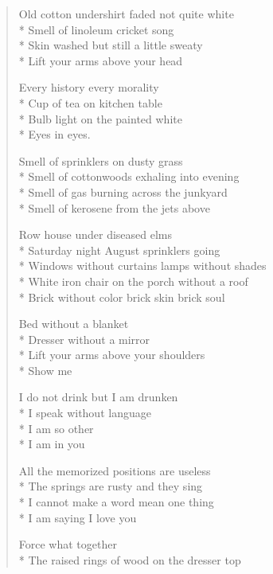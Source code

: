 \documentclass[english,11pt,letterpaper,onecolumn]{scrbook}
\begin{document}
\begin{verse}
Old cotton undershirt faded not quite white \\*
Smell of linoleum cricket song \\*
Skin washed but still a little sweaty \\*
Lift your arms above your head



Every history every morality \\*
Cup of tea on kitchen table \\*
Bulb light on the painted white \\*
Eyes in eyes.



Smell of sprinklers on dusty grass \\*
Smell of cottonwoods exhaling into evening \\*
Smell of gas burning across the junkyard \\*
Smell of kerosene from the jets above



Row house under diseased elms \\*
Saturday night August sprinklers going \\*
Windows without curtains lamps without shades \\*
White iron chair on the porch without a roof \\*
Brick without color brick skin brick soul



Bed without a blanket \\*
Dresser without a mirror \\*
Lift your arms above your shoulders \\*
Show me



I do not drink but I am drunken \\*
I speak without language \\*
I am so other \\*
I am in you



All the memorized positions are useless \\*
The springs are rusty and they sing \\*
I cannot make a word mean one thing \\*
I am saying I love you



Force what together \\*
The raised rings of wood on the dresser top




\end{verse}
\end{document}
